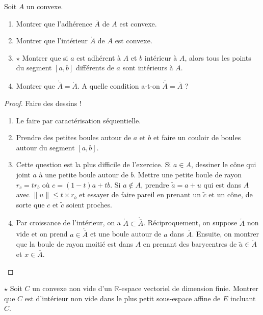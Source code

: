 \documentclass[french,a4paper]{article}
\newcommand{\R}{\mathbb{R}}
\theoremstyle{plain}
\theoremstyle{definition}
\theoremstyle{remark}
\begin{document}
\begin{ex}{}
	Soit $A$ un convexe.
	\begin{enumerate}
		\item Montrer que l'adhérence $\overline{A}$ de $A$ est convexe.
		\item Montrer que l'intérieur $\mathring{A}$ de $A$ est convexe.
		\item $\star$ Montrer que si $a$ est adhérent à $A$ et $b$ intérieur à $A$, alors tous les points du segment $[a,b]$ différents de $a$ sont intérieurs à $A$.
		\item Montrer que $\mathring{\overline{A}}=\mathring{A}$. A quelle condition a-t-on $\overline{\mathring{A}}=\overline{A}$ ?
	\end{enumerate}
\end{ex}
\begin{proof} Faire des dessins !
	\begin{enumerate}
		\item Le faire par caractérisation séquentielle.
		\item Prendre des petites boules autour de $a$ et $b$ et faire un couloir de boules autour du segment $[a,b]$.
		\item Cette question est la plus difficile de l'exercice. Si $a\in A$, dessiner le cône qui joint $a$ à une petite boule autour de $b$. Mettre une petite boule de rayon $r_c=tr_b$ où $c=(1-t)a+tb$. Si $a\notin A$, prendre $\tilde{a}=a+u$ qui est dans $A$ avec $\lVert u\rVert\leqslant t\times r_b$ et essayer de faire pareil en prenant un $\tilde{c}$ et un cône, de sorte que $c$ et $\tilde{c}$ soient proches.
		\item Par croissance de l'intérieur, on a $\mathring{A}\subset\mathring{\overline{A}}$. Réciproquement, on suppose $\mathring{A}$ non vide et on prend $a\in\mathring{\overline{A}}$ et une boule autour de $a$ dans $\overline{A}$. Ensuite, on montrer que la boule de rayon moitié est dans $A$ en prenant des barycentres de $\tilde{a}\in\mathring{A}$ et $x\in\overline{A}$.
	\end{enumerate}
\end{proof}

\begin{ex}{$\star$}
	Soit $C$ un convexe non vide d'un $\R$-espace vectoriel de dimension finie. Montrer que $C$ est d'intérieur non vide dans le plus petit sous-espace affine de $E$ incluant $C$.
\end{ex}
\end{document}
